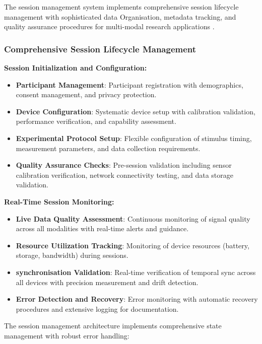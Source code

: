 \documentclass[11pt,a4paper]{report}
\begin{document}
The session management system implements comprehensive session lifecycle management with sophisticated data Organisation, metadata tracking, and quality assurance procedures for multi-modal research applications \cite{Wilson2014}. 

\subsubsection{Comprehensive Session Lifecycle Management}

\textbf{Session Initialization and Configuration:}
\begin{itemize}
  \item \textbf{Participant Management}: Participant registration with demographics, consent management, and privacy protection.
  \item \textbf{Device Configuration}: Systematic device setup with calibration validation, performance verification, and capability assessment.
  \item \textbf{Experimental Protocol Setup}: Flexible configuration of stimulus timing, measurement parameters, and data collection requirements.
  \item \textbf{Quality Assurance Checks}: Pre-session validation including sensor calibration verification, network connectivity testing, and data storage validation.
\end{itemize}

\textbf{Real-Time Session Monitoring:}
\begin{itemize}
  \item \textbf{Live Data Quality Assessment}: Continuous monitoring of signal quality across all modalities with real-time alerts and guidance.
  \item \textbf{Resource Utilization Tracking}: Monitoring of device resources (battery, storage, bandwidth) during sessions.
  \item \textbf{synchronisation Validation}: Real-time verification of temporal sync across all devices with precision measurement and drift detection.
  \item \textbf{Error Detection and Recovery}: Error monitoring with automatic recovery procedures and extensive logging for documentation.
\end{itemize}

The session management architecture implements comprehensive state management with robust error handling:
\end{document}
